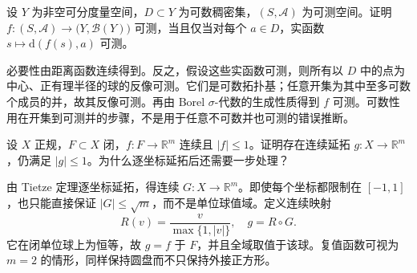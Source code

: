 \begin{exercise}\label{b1:ex:A1-distance-test}
设 \(Y\) 为非空可分度量空间，\(D\subset Y\) 为可数稠密集，\((S,\mathcal A)\) 为可测空间。证明 \(f:(S,\mathcal A)\rightarrow\bigl(Y,\mathcal B(Y)\bigr)\) 可测，当且仅当对每个 \(a\in D\)，实函数 \(s\mapsto \mathrm{d}(f(s),a)\) 可测。
\end{exercise}
\begin{solution}
必要性由距离函数连续得到。反之，假设这些实函数可测，则所有以 \(D\) 中的点为中心、正有理半径的球的反像可测。它们是可数拓扑基；任意开集为其中至多可数个成员的并，故其反像可测。再由 Borel \(\sigma\)-代数的生成性质得到 \(f\) 可测。可数性用在开集到可测并的步骤，不是用于任意不可数并也可测的错误推断。
\end{solution}

\begin{exercise}\label{b1:ex:A1-vector-extension}
设 \(X\) 正规，\(F\subset X\) 闭，\(f:F\rightarrow\mathbb R^m\) 连续且 \(|f|\le1\)。证明存在连续延拓 \(g:X\rightarrow\mathbb R^m\)，仍满足 \(|g|\le1\)。为什么逐坐标延拓后还需要一步处理？
\end{exercise}
\begin{solution}
由 Tietze 定理逐坐标延拓，得连续 \(G:X\rightarrow\mathbb R^m\)。即使每个坐标都限制在 \([-1,1]\)，也只能直接保证 \(|G|\le\sqrt m\)，而不是单位球值域。定义连续映射
\[
 R(v)=\frac{v}{\max\{1,|v|\}},\quad g=R\circ G.
\]
它在闭单位球上为恒等，故 \(g=f\) 于 \(F\)，并且全域取值于该球。复值函数可视为 \(m=2\) 的情形，同样保持圆盘而不只保持外接正方形。
\end{solution}

